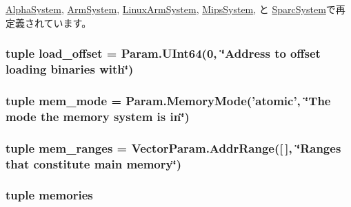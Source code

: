 \hyperlink{classAlphaSystem_1_1AlphaSystem_abd9c5cc6b7da624a69344d571bab1038}{AlphaSystem}, \hyperlink{classArmSystem_1_1ArmSystem_abd9c5cc6b7da624a69344d571bab1038}{ArmSystem}, \hyperlink{classArmSystem_1_1LinuxArmSystem_abd9c5cc6b7da624a69344d571bab1038}{LinuxArmSystem}, \hyperlink{classMipsSystem_1_1MipsSystem_abd9c5cc6b7da624a69344d571bab1038}{MipsSystem}, と \hyperlink{classSparcSystem_1_1SparcSystem_abd9c5cc6b7da624a69344d571bab1038}{SparcSystem}で再定義されています。\hypertarget{classSystem_1_1System_a3a0297171c7d57f0219cd11fc1e6891f}{
\subsubsection[{load\_\-offset}]{\setlength{\rightskip}{0pt plus 5cm}tuple {\bf load\_\-offset} = Param.UInt64(0, \char`\"{}Address to offset loading binaries with\char`\"{})}}
\label{classSystem_1_1System_a3a0297171c7d57f0219cd11fc1e6891f}
\hypertarget{classSystem_1_1System_a21e44df1e95121269e2d9c56bed48f0b}{
\subsubsection[{mem\_\-mode}]{\setlength{\rightskip}{0pt plus 5cm}tuple {\bf mem\_\-mode} = Param.MemoryMode('atomic', \char`\"{}The mode the memory system is in\char`\"{})}}
\label{classSystem_1_1System_a21e44df1e95121269e2d9c56bed48f0b}
\hypertarget{classSystem_1_1System_adf7ea00bee2082f49501f7f326c856c8}{
\subsubsection[{mem\_\-ranges}]{\setlength{\rightskip}{0pt plus 5cm}tuple {\bf mem\_\-ranges} = VectorParam.AddrRange(\mbox{[}$\,$\mbox{]}, \char`\"{}Ranges that constitute main memory\char`\"{})}}
\label{classSystem_1_1System_adf7ea00bee2082f49501f7f326c856c8}
\hypertarget{classSystem_1_1System_a0ebb0343c16ba35f99eb82a31a3abed7}{
\subsubsection[{memories}]{\setlength{\rightskip}{0pt plus 5cm}tuple {\bf memories}}}
